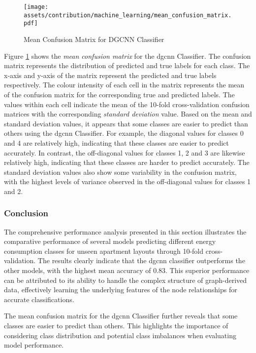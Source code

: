 \documentclass[a4paper, 12pt]{report}
\begin{document}
\begin{figure}
\centering
\texttt{[image: assets/contribution/machine\_learning/mean\_confusion\_matrix.pdf]}
\caption{Mean Confusion Matrix for DGCNN Classifier}
\label{fig:mean-confusion-matrix-for-Classifier}
\end{figure}

Figure \ref{fig:mean-confusion-matrix-for-Classifier} shows the \textit{mean confusion matrix} for the \acrshort{dgcnn} Classifier. The confusion matrix represents the distribution of predicted and true labels for each class. The x-axis and y-axis of the matrix represent the predicted and true labels respectively. The colour intensity of each cell in the matrix represents the mean of the confusion matrix for the corresponding true and predicted labels. The values within each cell indicate the mean of the \gls{10-fold cross-validation} confusion matrices with the corresponding \textit{\gls{standard deviation}} value. Based on the mean and \gls{standard deviation} values, it appears that some classes are easier to predict than others using the \acrshort{dgcnn} Classifier. For example, the diagonal values for classes 0 and 4 are relatively high, indicating that these classes are easier to predict accurately. In contrast, the off-diagonal values for classes 1, 2 and 3 are likewise relatively high, indicating that these classes are harder to predict accurately. The \gls{standard deviation} values also show some variability in the confusion matrix, with the highest levels of variance observed in the off-diagonal values for classes 1 and 2.

\subsubsection{Conclusion}\label{subsubsec:conclusion-classification}

The comprehensive performance analysis presented in this section illustrates the comparative performance of several models predicting different energy consumption classes for unseen apartment layouts through \gls{10-fold cross-validation}. The results clearly indicate that the \acrshort{dgcnn} classifier outperforms the other models, with the highest mean accuracy of 0.83. This superior performance can be attributed to its ability to handle the complex structure of graph-derived data, effectively learning the underlying features of the node relationships for accurate classifications.

The mean confusion matrix for the \acrshort{dgcnn} Classifier further reveals that some classes are easier to predict than others. This highlights the importance of considering class distribution and potential class imbalances when evaluating model performance.
\end{document}
